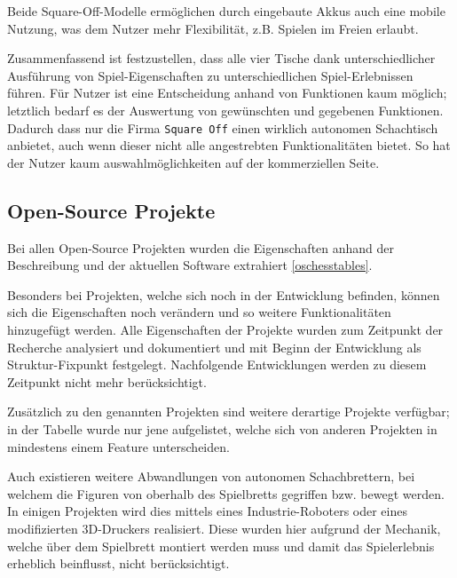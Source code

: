 Beide Square-Off-Modelle ermöglichen durch eingebaute Akkus auch eine
mobile Nutzung, was dem Nutzer mehr Flexibilität, z.B. Spielen im Freien
erlaubt.

Zusammenfassend ist festzustellen, dass alle vier Tische dank
unterschiedlicher Ausführung von Spiel-Eigenschaften zu
unterschiedlichen Spiel-Erlebnissen führen. Für Nutzer ist eine
Entscheidung anhand von Funktionen kaum möglich; letztlich bedarf es der
Auswertung von gewünschten und gegebenen Funktionen. Dadurch dass nur
die Firma \passthrough{\lstinline!Square Off!} einen wirklich autonomen
Schachtisch anbietet, auch wenn dieser nicht alle angestrebten
Funktionalitäten bietet. So hat der Nutzer kaum auswahlmöglichkeiten auf
der kommerziellen Seite.

\hypertarget{open-source-projekte}{%
\subsection{Open-Source Projekte}\label{open-source-projekte}}

Bei allen Open-Source Projekten wurden die Eigenschaften anhand der
Beschreibung und der aktuellen Software extrahiert \ref{oschesstables}.

Besonders bei Projekten, welche sich noch in der Entwicklung befinden,
können sich die Eigenschaften noch verändern und so weitere
Funktionalitäten hinzugefügt werden. Alle Eigenschaften der Projekte
wurden zum Zeitpunkt der Recherche analysiert und dokumentiert und mit
Beginn der Entwicklung als Struktur-Fixpunkt festgelegt. Nachfolgende
Entwicklungen werden zu diesem Zeitpunkt nicht mehr berücksichtigt.

Zusätzlich zu den genannten Projekten sind weitere derartige Projekte
verfügbar; in der Tabelle wurde nur jene aufgelistet, welche sich von
anderen Projekten in mindestens einem Feature unterscheiden.

Auch existieren weitere Abwandlungen von autonomen Schachbrettern, bei
welchem die Figuren von oberhalb des Spielbretts gegriffen bzw. bewegt
werden. In einigen Projekten wird dies mittels eines Industrie-Roboters
\cite{actprojectrobot} oder eines modifizierten
3D-Druckers\cite{atcproject3dprinter} realisiert. Diese wurden hier
aufgrund der Mechanik, welche über dem Spielbrett montiert werden muss
und damit das Spielerlebnis erheblich beinflusst, nicht berücksichtigt.

